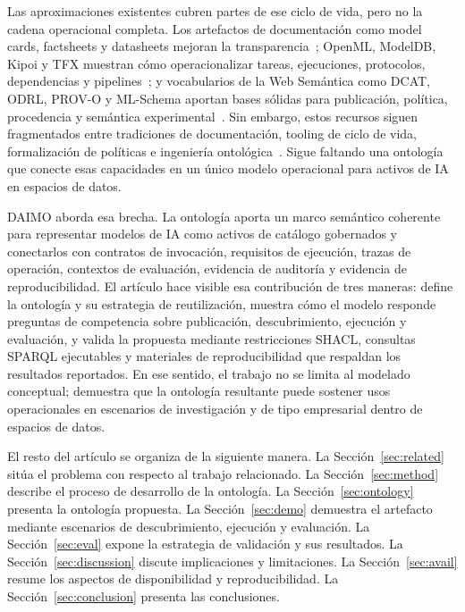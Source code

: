 \documentclass[11pt,a4paper]{article}
\begin{document}
Las aproximaciones existentes cubren partes de ese ciclo de vida, pero no la cadena operacional completa. Los artefactos de documentación como model cards, factsheets y datasheets mejoran la transparencia~\cite{mitchell19,arnold19,gebru21}; OpenML, ModelDB, Kipoi y TFX muestran cómo operacionalizar tareas, ejecuciones, protocolos, dependencias y pipelines~\cite{openml,modeldb,kipoi,tfx}; y vocabularios de la Web Semántica como DCAT, ODRL, PROV-O y ML-Schema aportan bases sólidas para publicación, política, procedencia y semántica experimental~\cite{dcat2,odrl22,provo,mls}. Sin embargo, estos recursos siguen fragmentados entre tradiciones de documentación, tooling de ciclo de vida, formalización de políticas e ingeniería ontológica~\cite{pandit-esteves,penteado23,bareedu24,ferranti,robaldo}. Sigue faltando una ontología que conecte esas capacidades en un único modelo operacional para activos de IA en espacios de datos.

DAIMO aborda esa brecha. La ontología aporta un marco semántico coherente para representar modelos de IA como activos de catálogo gobernados y conectarlos con contratos de invocación, requisitos de ejecución, trazas de operación, contextos de evaluación, evidencia de auditoría y evidencia de reproducibilidad. El artículo hace visible esa contribución de tres maneras: define la ontología y su estrategia de reutilización, muestra cómo el modelo responde preguntas de competencia sobre publicación, descubrimiento, ejecución y evaluación, y valida la propuesta mediante restricciones SHACL, consultas SPARQL ejecutables y materiales de reproducibilidad que respaldan los resultados reportados. En ese sentido, el trabajo no se limita al modelado conceptual; demuestra que la ontología resultante puede sostener usos operacionales en escenarios de investigación y de tipo empresarial dentro de espacios de datos.

El resto del artículo se organiza de la siguiente manera. La Sección~\ref{sec:related} sitúa el problema con respecto al trabajo relacionado. La Sección~\ref{sec:method} describe el proceso de desarrollo de la ontología. La Sección~\ref{sec:ontology} presenta la ontología propuesta. La Sección~\ref{sec:demo} demuestra el artefacto mediante escenarios de descubrimiento, ejecución y evaluación. La Sección~\ref{sec:eval} expone la estrategia de validación y sus resultados. La Sección~\ref{sec:discussion} discute implicaciones y limitaciones. La Sección~\ref{sec:avail} resume los aspectos de disponibilidad y reproducibilidad. La Sección~\ref{sec:conclusion} presenta las conclusiones.
\end{document}
